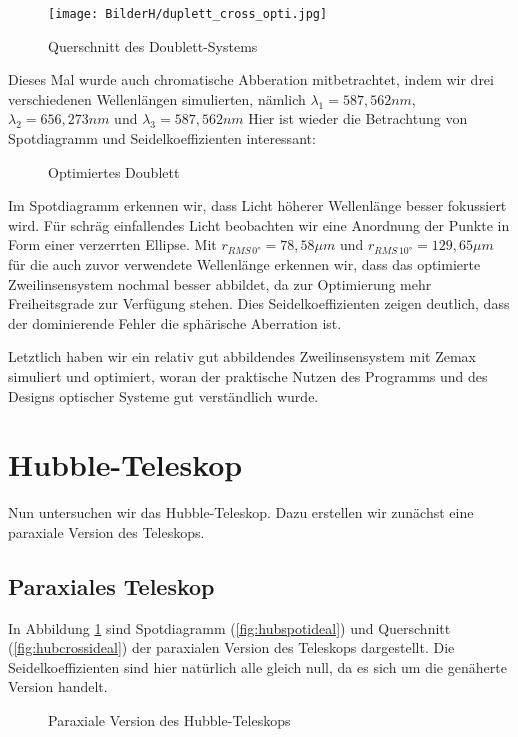 \documentclass[twoside,colorback,accentcolor=tud4c,11pt]{tudreport}
\begin{document}
\begin{figure}[H]
\centering
   	\begin{minipage}[b]{\textwidth}
   	\centering
   	\texttt{[image: BilderH/duplett\_cross\_opti.jpg]}
   	\caption{Querschnitt des Doublett-Systems}
  	\end{minipage}
\end{figure}
	
	Dieses Mal wurde auch chromatische Abberation mitbetrachtet, indem wir drei verschiedenen Wellenlängen simulierten, nämlich $\lambda_1 = 587,562 nm$, $\lambda_2 = 656,273 nm$ und $\lambda_3 = 587,562 nm$
	Hier ist wieder die Betrachtung von Spotdiagramm und Seidelkoeffizienten interessant:
	
	\begin{figure}[H]
\centering
  \quad
  \quad   
  \caption{Optimiertes Doublett}
\end{figure}
	
	Im Spotdiagramm erkennen wir, dass Licht höherer Wellenlänge besser fokussiert wird. Für schräg einfallendes Licht beobachten wir eine Anordnung der Punkte in Form einer verzerrten Ellipse.
	  Mit $r_{RMS \, 0°} = 78,58 \mu m $ und $r_{RMS \, 10°} = 129,65 \mu m $ für die auch zuvor verwendete Wellenlänge erkennen wir, dass das optimierte Zweilinsensystem nochmal besser abbildet, da zur Optimierung mehr Freiheitsgrade zur Verfügung stehen. 
	 Dies Seidelkoeffizienten zeigen deutlich, dass der dominierende Fehler die sphärische Aberration ist. 
	 
	 Letztlich haben wir ein relativ gut abbildendes Zweilinsensystem mit Zemax simuliert und optimiert, woran der praktische Nutzen des Programms und des Designs optischer Systeme gut verständlich wurde.
\section{Hubble-Teleskop}
Nun untersuchen wir das Hubble-Teleskop. Dazu erstellen wir zunächst eine paraxiale Version des Teleskops.
\subsection{Paraxiales Teleskop}
In Abbildung \ref{fig:hubideal} sind Spotdiagramm (\ref{fig:hubspotideal}) und Querschnitt (\ref{fig:hubcrossideal}) der paraxialen Version des Teleskops dargestellt. Die Seidelkoeffizienten sind hier natürlich alle gleich null, da es sich um die genäherte Version handelt.
\begin{figure}[H]
\centering
  \quad
  \quad   
  \caption{Paraxiale Version des Hubble-Teleskops}
  \label{fig:hubideal}
\end{figure}
\end{document}
